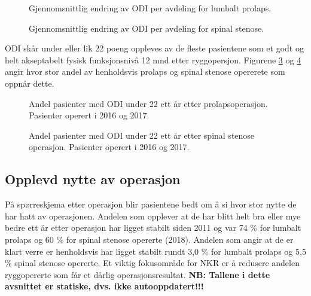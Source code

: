 \documentclass [norsk,a4paper,twoside]{article}\usepackage[]{graphicx}\usepackage[]{color}
\begin{document}
\begin{figure}[h] 
\caption{Gjennomsnittlig endring av ODI per avdeling for lumbalt prolaps.}
\label{fig:OswEndrAvdPro}
\end{figure}

\begin{figure}[h] 
\caption{Gjennomsnittlig endring av ODI per avdeling for spinal stenose.}
\label{fig:OswEndrAvdSS}
\end{figure}



\clearpage


ODI skår under eller lik 22 poeng oppleves av de fleste pasientene som et godt og helt akseptabelt fysisk funksjonsnivå 12 mnd etter ryggopersjon. Figurene \ref{fig:Osw22Pro} og \ref{fig:Osw22SS} angir hvor stor andel av henholdsvis prolaps og spinal stenose opererete som oppnår dette.

\begin{figure}[ht]
\caption{\label{fig:Osw22Pro}   Andel pasienter med ODI under 22 ett år
      etter prolapsoperasjon. Pasienter operert i 2016 og 2017.}
\end{figure}

\begin{figure}[ht]
\caption{\label{fig:Osw22SS}   Andel pasienter med ODI under 22 ett år
      etter spinal stenose operasjon. Pasienter operert i 2016 og 2017.}
\end{figure}


\clearpage

\subsection{Opplevd nytte av operasjon}
På spørreskjema etter operasjon blir pasientene bedt om å si hvor stor nytte de har hatt av operasjonen.
Andelen som opplever at de har blitt helt bra eller mye bedre ett år etter operasjon har ligget stabilt 
siden 2011 og var 74 \% for lumbalt prolaps og 60 \% for spinal stenose opererte (2018). 
Andelen  som angir at de er klart verre er henholdsvis har ligget stabilt rundt 3,0 \% for lumbalt prolaps og 5,5 \% spinal stenose opererte.
Et viktig fokusområde for NKR er å redusere andelen ryggopererte som får et dårlig operasjonsresultat.
\textbf{NB: Tallene i dette avsnittet er statiske, dvs. ikke autooppdatert!!!}
\end{document}
